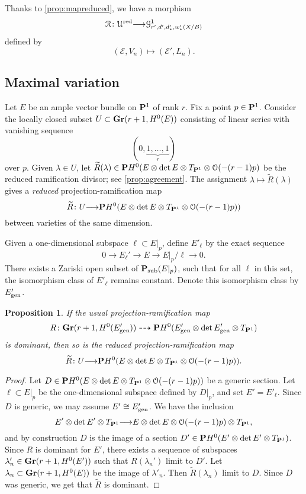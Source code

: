 \documentclass[11pt,reqno]{amsart}
\theoremstyle{plain}
\newtheorem{proposition}[theorem]{Proposition}
\theoremstyle{definition}
\theoremstyle{remark}
\numberwithin{equation}{section}
\renewcommand{\to}{{\longrightarrow}}
\numberwithin{equation}{section}
\renewcommand{\O}{\mathcal O}
\begin{document}
Thanks to \autoref{prop:mapreduced}, we have a morphism
\begin{equation}\label{eqn:llsR}
 \mathcal R \from \mathcal U^{\rm red} \to \mathcal G^1_{r',d',d'_*,w'_*(X/B)}
\end{equation}
defined by
\[ (\mathcal E, V_n) \mapsto (\mathcal E', L_n).\]

\subsection{Maximal variation}
Let $E$ be an ample vector bundle on $\P^1$ of rank $r$.
Fix a point $p \in \P^1$.
Consider  the locally closed subset $U \subset \Gr(r+1, H^0(E))$ consisting of linear series with vanishing sequence
\[ (0,\underbrace{1,\dots, 1}_{r})\]
over $p$.
Given $\lambda \in U$, let $\widetilde R(\lambda) \in \P H^0(E \otimes \det E \otimes T_{\P^1} \otimes \O(-(r-1)p)$ be the reduced ramification divisor; see \autoref{prop:agreement}.
The assignment $\lambda \mapsto \widetilde R(\lambda)$ gives a \emph{reduced} projection-ramification map
\begin{equation}\label{eqn:rrd}
  \widetilde R \from U \to \P H^0(E \otimes \det E \otimes T_{\P^1} \otimes \O(-(r-1)p))
\end{equation}
between varieties of the same dimension.

Given a one-dimensional subspace $\ell \subset E|_p$, define $E'_\ell$ by the exact sequence
\[ 0 \to E_\ell' \to E \to E|_p/\ell\to 0.\]
There exists a Zariski open subset of $\P_{\rm sub}(E|_p)$, such that for all $\ell$ in this set, the isomorphism class of $E'_{\ell}$ remains constant.
Denote this isomorphism class by $E'_{\rm gen}$.
\begin{proposition}\label{prop:domred}
  If the usual projection-ramification map
  \[ R\from \Gr(r+1, H^0(E'_{\rm gen})) \dashrightarrow \P H^0(E'_{\rm gen} \otimes \det E'_{\rm gen} \otimes T_{\P^1})\]
  is dominant, then so is the reduced projection-ramification map
  \[\widetilde R\from U \to \P H^0(E \otimes \det E \otimes T_{\P^1} \otimes \O(-(r-1)p)).\]
\end{proposition}
\begin{proof}
  Let $D \in \P H^0(E \otimes \det E \otimes T_{\P^1} \otimes \O(-(r-1)p))$ be a generic section.
  Let $\ell \subset E|_p$ be the one-dimensional subspace defined by $D|_p$, and set $E' = E'_{\ell}$.
  Since $D$ is generic, we may assume $E' \cong E'_{\rm gen}$.
  We have the inclusion
  \[
    E' \otimes \det E' \otimes T_{\P^1} \to E \otimes \det E \otimes \O(-(r-1)p) \otimes T_{\P^1},
  \]
  and by construction $D$ is the image of a section $D' \in \P H^0(E' \otimes \det E' \otimes T_{\P^1})$.
  Since $R$ is dominant for $E'$, there exists a sequence of subspaces $\lambda_n' \in \Gr(r+1, H^0(E'))$ such that $R(\lambda_n')$  limit to $D'$.
  Let $\lambda_n \subset \Gr(r+1, H^0(E))$ be the image of $\lambda'_n$.
  Then $\widetilde R(\lambda_n)$ limit to $D$.
  Since $D$ was generic, we get that $\widetilde R$ is dominant.
\end{proof}
\end{document}
